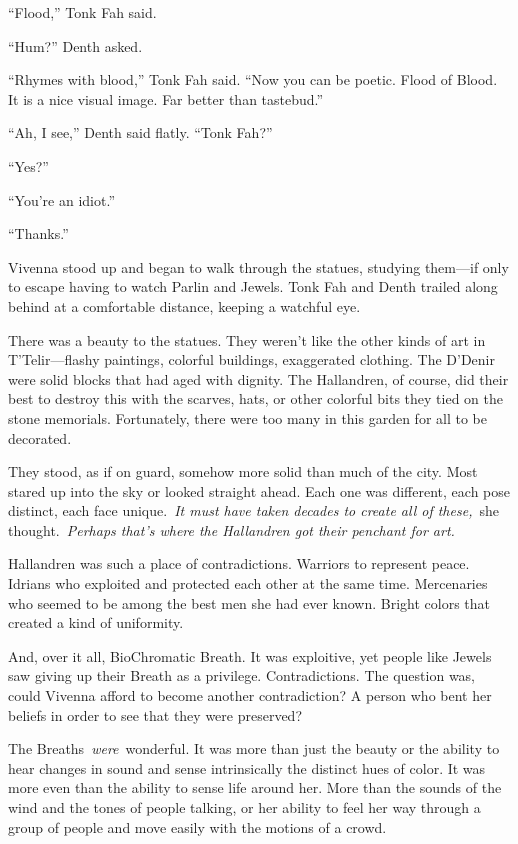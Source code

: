 “Flood,” Tonk Fah said.

“Hum?” Denth asked.

“Rhymes with blood,” Tonk Fah said. “Now you can be poetic. Flood of Blood. It is a nice visual image. Far better than tastebud.”

“Ah, I see,” Denth said flatly. “Tonk Fah?”

“Yes?”

“You’re an idiot.”

“Thanks.”

Vivenna stood up and began to walk through the statues, studying them—if only to escape having to watch Parlin and Jewels. Tonk Fah and Denth trailed along behind at a comfortable distance, keeping a watchful eye.

There was a beauty to the statues. They weren’t like the other kinds of art in T’Telir—flashy paintings, colorful buildings, exaggerated clothing. The D’Denir were solid blocks that had aged with dignity. The Hallandren, of course, did their best to destroy this with the scarves, hats, or other colorful bits they tied on the stone memorials. Fortunately, there were too many in this garden for all to be decorated.

They stood, as if on guard, somehow more solid than much of the city. Most stared up into the sky or looked straight ahead. Each one was different, each pose distinct, each face unique.~\textit{It must have taken decades to create all of these,}~she thought.~\textit{Perhaps that’s where the Hallandren got their penchant for art.}

Hallandren was such a place of contradictions. Warriors to represent peace. Idrians who exploited and protected each other at the same time. Mercenaries who seemed to be among the best men she had ever known. Bright colors that created a kind of uniformity.

And, over it all, BioChromatic Breath. It was exploitive, yet people like Jewels saw giving up their Breath as a privilege. Contradictions. The question was, could Vivenna afford to become another contradiction? A person who bent her beliefs in order to see that they were preserved?

The Breaths~\textit{were}~wonderful. It was more than just the beauty or the ability to hear changes in sound and sense intrinsically the distinct hues of color. It was more even than the ability to sense life around her. More than the sounds of the wind and the tones of people talking, or her ability to feel her way through a group of people and move easily with the motions of a crowd.

